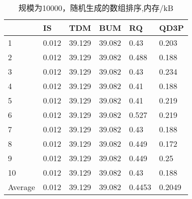 \documentclass[12pt,a4paper]{ctexart}
\begin{document}
\begin{table}[H]
    \setlength{\abovecaptionskip}{0cm}
    \setlength{\belowcaptionskip}{0.5cm}
    \small
    \centering
    \caption[short]{规模为10000，随机生成的数组排序,内存/kB}
    \begin{tabular}{|l|l|l|l|l|l|}
        \hline
                & IS    & TDM    & BUM    & RQ     & QD3P   \\ \hline
        1       & 0.012 & 39.129 & 39.082 & 0.43   & 0.203  \\ \hline
        2       & 0.012 & 39.129 & 39.082 & 0.488  & 0.188  \\ \hline
        3       & 0.012 & 39.129 & 39.082 & 0.43   & 0.234  \\ \hline
        4       & 0.012 & 39.129 & 39.082 & 0.41   & 0.188  \\ \hline
        5       & 0.012 & 39.129 & 39.082 & 0.41   & 0.219  \\ \hline
        6       & 0.012 & 39.129 & 39.082 & 0.527  & 0.219  \\ \hline
        7       & 0.012 & 39.129 & 39.082 & 0.43   & 0.188  \\ \hline
        8       & 0.012 & 39.129 & 39.082 & 0.449  & 0.172  \\ \hline
        9       & 0.012 & 39.129 & 39.082 & 0.449  & 0.25   \\ \hline
        10      & 0.012 & 39.129 & 39.082 & 0.43   & 0.188  \\ \hline
        Average & 0.012 & 39.129 & 39.082 & 0.4453 & 0.2049 \\ \hline
    \end{tabular}
\end{table}
\end{document}
